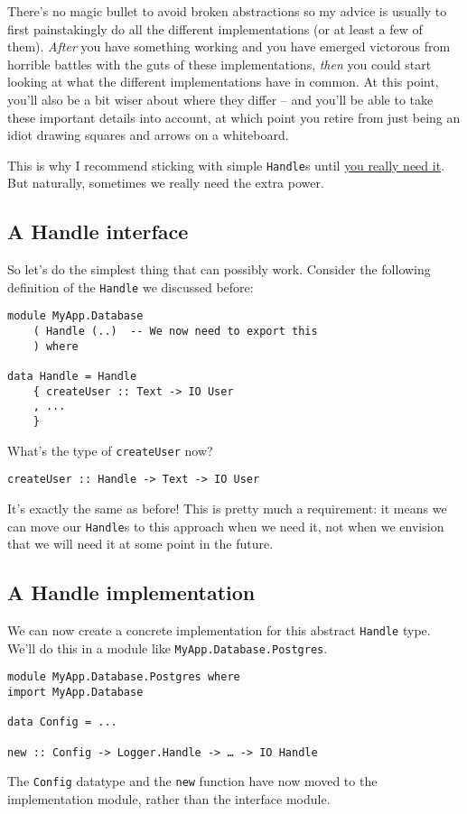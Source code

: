 There's no magic bullet to avoid broken abstractions so my advice is
usually to first painstakingly do all the different implementations (or
at least a few of them). \emph{After} you have something working and you
have emerged victorous from horrible battles with the guts of these
implementations, \emph{then} you could start looking at what the
different implementations have in common. At this point, you'll also be
a bit wiser about where they differ -- and you'll be able to take these
important details into account, at which point you retire from just
being an idiot drawing squares and arrows on a whiteboard.

This is why I recommend sticking with simple \texttt{Handle}s until
\href{https://en.wikipedia.org/wiki/You_aren\%27t_gonna_need_it}{you
really need it}. But naturally, sometimes we really need the extra
power.

\subsection{A Handle interface}

So let's do the simplest thing that can possibly work. Consider the
following definition of the \texttt{Handle} we discussed before:

\begin{verbatim}
module MyApp.Database
    ( Handle (..)  -- We now need to export this
    ) where

data Handle = Handle
    { createUser :: Text -> IO User
    , ...
    }
\end{verbatim}
What's the type of \texttt{createUser} now?

\begin{verbatim}
createUser :: Handle -> Text -> IO User
\end{verbatim}
It's exactly the same as before! This is pretty much a requirement: it
means we can move our \texttt{Handle}s to this approach when we need it,
not when we envision that we will need it at some point in the future.

\subsection{A Handle implementation}

We can now create a concrete implementation for this abstract
\texttt{Handle} type. We'll do this in a module like
\texttt{MyApp.Database.Postgres}.

\begin{verbatim}
module MyApp.Database.Postgres where
import MyApp.Database

data Config = ...

new :: Config -> Logger.Handle -> … -> IO Handle
\end{verbatim}
The \texttt{Config} datatype and the \texttt{new} function have now
moved to the implementation module, rather than the interface module.

